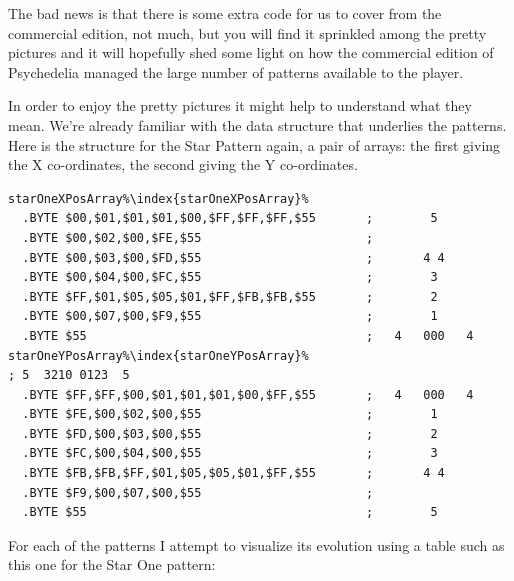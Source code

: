 The bad news is that there is some extra code for us to cover from the commercial edition, not much,
but you will find it sprinkled among the pretty pictures and it will hopefully shed some light
on how the commercial edition of Psychedelia managed the large number of patterns available to the
player.

\clearpage
In order to enjoy the pretty pictures it might help to understand what they mean. We're already 
familiar with the data structure that underlies the patterns. Here is the structure for the Star
Pattern again, a pair of arrays: the first giving the X co-ordinates, the second giving the Y
co-ordinates.
\begin{lstlisting}[caption=Source code for the Star.,escapechar=\%]
starOneXPosArray%\index{starOneXPosArray}%  
  .BYTE $00,$01,$01,$01,$00,$FF,$FF,$FF,$55       ;        5       
  .BYTE $00,$02,$00,$FE,$55                       ;                
  .BYTE $00,$03,$00,$FD,$55                       ;       4 4      
  .BYTE $00,$04,$00,$FC,$55                       ;        3       
  .BYTE $FF,$01,$05,$05,$01,$FF,$FB,$FB,$55       ;        2       
  .BYTE $00,$07,$00,$F9,$55                       ;        1       
  .BYTE $55                                       ;   4   000   4  
starOneYPosArray%\index{starOneYPosArray}%                                  ; 5  3210 0123  5  
  .BYTE $FF,$FF,$00,$01,$01,$01,$00,$FF,$55       ;   4   000   4  
  .BYTE $FE,$00,$02,$00,$55                       ;        1       
  .BYTE $FD,$00,$03,$00,$55                       ;        2       
  .BYTE $FC,$00,$04,$00,$55                       ;        3       
  .BYTE $FB,$FB,$FF,$01,$05,$05,$01,$FF,$55       ;       4 4      
  .BYTE $F9,$00,$07,$00,$55                       ;                
  .BYTE $55                                       ;        5       
\end{lstlisting}

For each of the patterns I attempt to visualize its evolution using a table such as this one for 
the Star One pattern:

